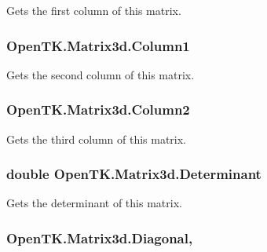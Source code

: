 Gets the first column of this matrix. 

\hypertarget{struct_open_t_k_1_1_matrix3d_a73eb828837ef981008c7a7c886f0ab61}{
\subsubsection[{Column1}]{ Open\-T\-K.\-Matrix3d.\-Column1\hspace{0.3cm}{\ttfamily [get]}}}\label{struct_open_t_k_1_1_matrix3d_a73eb828837ef981008c7a7c886f0ab61}


Gets the second column of this matrix. 

\hypertarget{struct_open_t_k_1_1_matrix3d_af2d083453b62ace565ce14add3aa2365}{
\subsubsection[{Column2}]{ Open\-T\-K.\-Matrix3d.\-Column2\hspace{0.3cm}{\ttfamily [get]}}}\label{struct_open_t_k_1_1_matrix3d_af2d083453b62ace565ce14add3aa2365}


Gets the third column of this matrix. 

\hypertarget{struct_open_t_k_1_1_matrix3d_af2084cf120a96d19e0c7c11489d05319}{
\subsubsection[{Determinant}]{\setlength{\rightskip}{0pt plus 5cm}double Open\-T\-K.\-Matrix3d.\-Determinant\hspace{0.3cm}{\ttfamily [get]}}}\label{struct_open_t_k_1_1_matrix3d_af2084cf120a96d19e0c7c11489d05319}


Gets the determinant of this matrix. 

\hypertarget{struct_open_t_k_1_1_matrix3d_af9f7cfaf431f57314db21674ea20132a}{
\subsubsection[{Diagonal}]{ Open\-T\-K.\-Matrix3d.\-Diagonal\hspace{0.3cm}{\ttfamily [get]}, {\ttfamily [set]}}}\label{struct_open_t_k_1_1_matrix3d_af9f7cfaf431f57314db21674ea20132a}


